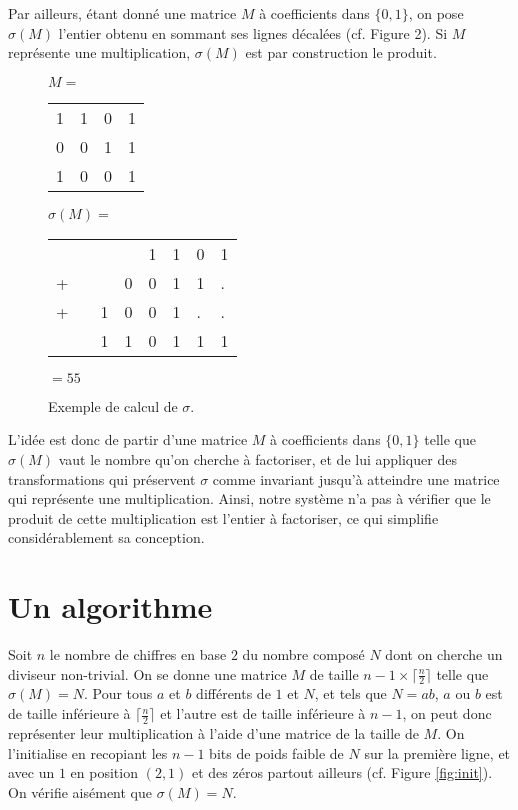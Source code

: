 \documentclass[11pt, openany]{article}
\begin{document}
Par ailleurs, étant donné une matrice $M$ à coefficients dans $\{0,1\}$, on pose $\sigma (M)$ l'entier obtenu en sommant ses lignes décalées (cf. Figure 2). Si $M$ représente une multiplication, $\sigma(M)$ est par construction le produit. 

\begin{figure}[]
\centering
\begin{minipage}[]{0.3\linewidth}
$M=$
\begin{tabular}{cccc}
1&1&0&1\\
0&0&1&1\\
1&0&0&1\\
\end{tabular}
\end{minipage}
\quad
\begin{minipage}[]{0.6\linewidth}
$\sigma(M)=$
\begin{tabular}{llllllll}
&&&&1&1&0&1\\
+&&&0&0&1&1&.\\
+&&1&0&0&1&.&.\\
\hline
&&1&1&0&1&1&1\\
\end{tabular}
$=55$
\end{minipage}
\caption{Exemple de calcul de $\sigma$.}

\end{figure}

L'idée est donc de partir d'une matrice $M$ à coefficients dans $\{0,1\}$ telle que $\sigma(M)$ vaut le nombre qu'on cherche à factoriser, et de lui appliquer des transformations qui préservent $\sigma$ comme invariant jusqu'à atteindre une matrice qui représente une multiplication. Ainsi, notre système n'a pas à vérifier que le produit de cette multiplication est l'entier à factoriser, ce qui simplifie considérablement sa conception.

\section*{Un algorithme}

Soit $n$ le nombre de chiffres en base $2$ du nombre composé $N$ dont on cherche un diviseur non-trivial. On se donne une matrice $M$ de taille $ n-1 \times \lceil \frac{n}{2}\rceil$ telle que $\sigma(M)=N$. Pour tous $a$ et $b$ différents de $1$ et $N$, et tels que $N = ab$, $a$ ou $b$ est de taille inférieure à $\lceil\frac{n}{2}\rceil$ et l'autre est de taille inférieure à $n-1$, on peut donc représenter leur multiplication à l'aide d'une matrice de la taille de $M$. On l'initialise en recopiant les $n-1$ bits de poids faible de $N$ sur la première ligne, et avec un $1$ en position $(2,1)$ et des zéros partout ailleurs (cf. Figure \ref{fig:init}). On vérifie aisément que $\sigma(M)=N$. 
\end{document}
